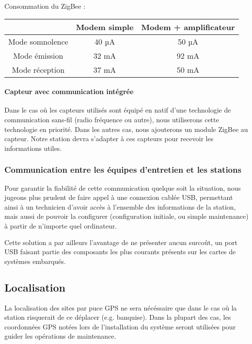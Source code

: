 Consommation du ZigBee :

\begin{center}
\begin{tabular}{|c|c|c|}
\hline  & Modem simple & Modem + amplificateur \\ 
\hline Mode somnolence & 40 µA & 50 µA \\ 
\hline Mode émission & 32 mA  & 92 mA \\ 
\hline Mode réception & 37 mA  & 50 mA \\ 
\hline 
\end{tabular} 
\end{center}

\paragraph{Capteur avec communication intégrée}

Dans le cas où les capteurs utilisés sont équipé en natif d’une technologie de communication sans-fil (radio fréquence ou autre), nous utiliserons cette technologie en priorité. Dans les autres cas, nous ajouterons un module ZigBee au capteur. Notre station devra s’adapter à ces capteurs pour recevoir les informations utiles.

\subsubsection{Communication entre les équipes d’entretien et les stations}

Pour garantir la fiabilité de cette communication quelque soit la situation, nous jugeons plus prudent de faire appel à une connexion cablée USB, permettant ainsi à un technicien d’avoir accès à l’ensemble des informations de la station, mais aussi de pouvoir la configurer (configuration initiale, ou simple maintenance) à partir de n’importe quel ordinateur.

Cette solution a par ailleurs l’avantage de ne présenter aucun surcoût, un port USB faisant partie des composants les plus courants présents sur les cartes de systèmes embarqués.

\subsection{Localisation}

La localisation des sites par puce GPS ne sera nécéssaire que dans le cas où la station risquerait de ce déplacer (e.g. banquise). Dans la plupart des cas, les coordonnées GPS notées lors de l’installation du système seront utilisées pour guider les opérations de maintenance.

